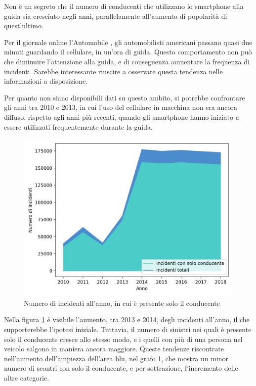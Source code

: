 \documentclass[a4paper,12pt]{report}
\begin{document}
Non è un segreto che il numero di conducenti 
che utilizzano lo smartphone alla guida 
sia cresciuto negli anni, parallelamente all'aumento di popolarità di quest'ultimo. 

Per il giornale online l'Automobile \cite{AUTOMOBILE:1}, gli automobilisti americani 
passano quasi due minuti guardando il cellulare, in un'ora di guida.
Questo comportamento non può che diminuire l'attenzione alla guida, e di conseguenza 
aumentare la frequenza di incidenti. 
Sarebbe interessante riuscire a osservare questa tendenza nelle 
informazioni a disposizione.

Per quanto non siano disponibili dati su questo ambito, si potrebbe confrontare gli 
anni tra 2010 e 2013, in cui l'uso del cellulare in macchina non era ancora diffuso, 
rispetto agli anni più recenti, quando gli smartphone hanno iniziato a essere utilizzati 
frequentemente durante la guida.

\begin{figure}
    \includegraphics[width=\linewidth]{../src/incidenti/incidenti_senza_coords/anno/incremento_incidenti.png}
    \caption{Numero di incidenti all'anno, in cui è presente solo il conducente}
    \label{fig:incremento-incidenti}
\end{figure}

Nella figura \ref{fig:incremento-incidenti} è visibile l'aumento, tra 2013 e 2014, degli 
incidenti all'anno, il che supporterebbe l'ipotesi iniziale.
Tuttavia, il numero di sinistri nei quali è presente solo il conducente 
cresce allo stesso modo, e i quelli con più di una persona nel veicolo 
salgono in maniera ancora maggiore. 
Queste tendenze riscontrate nell'aumento dell'ampiezza dell'area blu, nel grafo 
\ref{fig:incremento-incidenti}, che mostra un minor numero di scontri con solo il conducente, 
e per sottrazione, l'incremento delle altre categorie.
\end{document}
